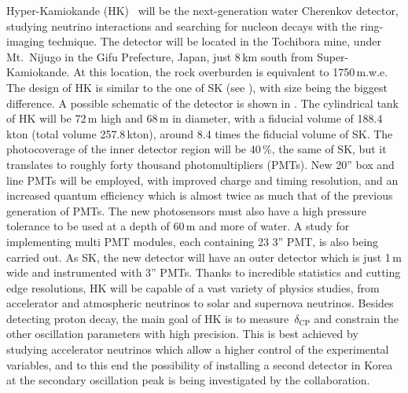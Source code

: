 Hyper-Kamiokande (HK)~\cite{Abe:2018uyc} will be the next-generation water Cherenkov detector, %
studying neutrino interactions and searching for nucleon decays with the ring-imaging technique.
The detector will be located in the Tochibora mine, under Mt.\ Nijugo in the Gifu Prefecture, Japan, 
just 8\,km south from Super-Kamiokande.
At this location, the rock overburden is equivalent to 1750\,m.w.e.
The design of HK is similar to the one of SK (see ), with size being the biggest difference.
A possible schematic of the detector is shown in .
The cylindrical tank of HK will be 72\,m high and 68\,m in diameter, with a fiducial volume of 188.4\,kton (total volume 257.8\,kton), %
around 8.4 times the fiducial volume of SK.
The photocoverage of the inner detector region will be 40\,\%, the same of SK, %
but it translates to roughly forty thousand photomultipliers (PMTs).
New 20'' box and line PMTs will be employed, with improved charge and timing resolution, %
and an increased quantum efficiency which is almost twice as much that of the previous generation of PMTs.
The new photosensors must also have a high pressure tolerance to be used at a depth of 60\,m and more of water.
A study for implementing multi PMT modules, each containing 23 3'' PMT, is also being carried out.
As SK, the new detector will have an outer detector which is just 1\,m wide and instrumented with 3'' PMTs.
Thanks to incredible statistics and cutting edge resolutions, HK will be capable of a vast variety of physics studies, %
from accelerator and atmospheric neutrinos to solar and supernova neutrinos.
Besides detecting proton decay, the main goal of HK is to measure~$\delta_\text{CP}$ and constrain the other oscillation parameters %
with high precision.
This is best achieved by studying accelerator neutrinos which allow a higher control of the experimental variables, %
and to this end the possibility of installing a second detector in Korea %
at the secondary oscillation peak is being investigated by the collaboration.

